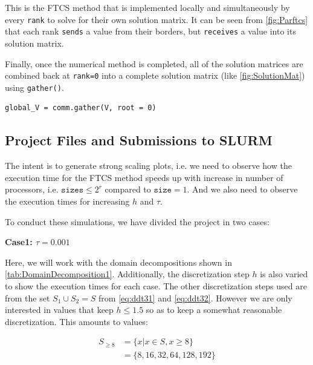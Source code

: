 This is the FTCS method that is implemented locally and simultaneously by every \texttt{rank} to solve for their own solution matrix. It can be seen from \autoref{fig:Parftcs} that each rank \texttt{sends} a value from their borders, but \texttt{receives} a value into its solution matrix.

\figParftcs

Finally, once the numerical method is completed, all of the solution matrices are combined back at \texttt{rank=0} into a complete solution matrix (like \autoref{fig:SolutionMat}) using \texttt{gather()}.

\begin{lstlisting}
global_V = comm.gather(V, root = 0)
\end{lstlisting}

\subsection{Project Files and Submissions to SLURM}
The intent is to generate strong scaling plots, i.e. we need to observe how the execution time for the FTCS method speeds up with increase in number of processors, i.e. $\texttt{sizes}\leq2^r$ compared to $\texttt{size}=1$. And we also need to observe the execution times for increasing $h$ and $\tau$.

To conduct these simulations, we have divided the project in two cases:

\vspace{1mm}
\textbf{Case1: $\tau=0.001$}

Here, we will work with the domain decompositions shown in \autoref{tab:DomainDecomposition1}. Additionally, the discretization step $h$ is also varied to show the execution times for each case. The other discretization steps used are from the set $S_1 \cup S_2 = S$ from \autoref{eq:ddt31} and \autoref{eq:ddt32}. However we are only interested in values that keep $h \leq 1.5$ so as to keep a somewhat reasonable discretization. This amounts to values: 

\begin{equation}
    \begin{aligned}
    S_{\geq8} &= \{x| x \in S, x \geq 8\}  \\ 
    &= \{ 8,16,32,64,128,192 \}
    \end{aligned}
\end{equation}

